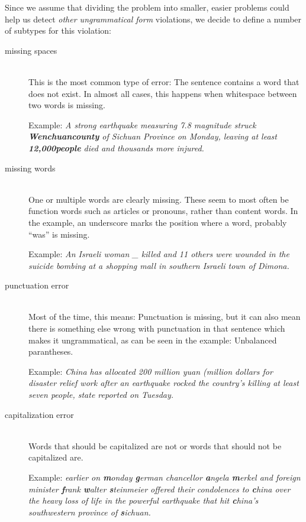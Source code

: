 \documentclass[a4paper,10pt]{scrartcl}
\theoremstyle{style}
\begin{document}
Since we assume that dividing the problem into smaller, easier problems could help us detect \textit{other ungrammatical form} violations, we decide to define a number of subtypes for this violation:

\begin{description}
\item[missing spaces] \hfill \\
	This is the most common type of error: The sentence contains a word that does not exist. In almost all cases, this happens when whitespace between two words is missing.

	Example: \textit{A strong earthquake measuring 7.8 magnitude struck \\\textbf{Wenchuancounty} of Sichuan Province on Monday, leaving at least \\\textbf{12,000people} died and thousands more injured.}

\item[missing words] \hfill \\
	One or multiple words are clearly missing. These seem to most often be function words such as articles or pronouns, rather than content words. In the example, an underscore marks the position where a word, probably ``was'' is missing.

	Example: \textit{An Israeli woman \_ killed and 11 others were wounded in the suicide bombing at a shopping mall in southern Israeli town of Dimona.}

\item[punctuation error] \hfill \\
	Most of the time, this means: Punctuation is missing, but it can also mean there is something else wrong with punctuation in that sentence which makes it ungrammatical, as can be seen in the example: Unbalanced parantheses.

	Example: \textit{China has allocated 200 million yuan (million dollars for disaster relief work after an earthquake rocked the country's killing at least seven people, state reported on Tuesday.}

\item[capitalization error] \hfill \\
	Words that should be capitalized are not or words that should not be capitalized are.

	Example: \textit{earlier on \textbf{m}onday \textbf{g}erman chancellor \textbf{a}ngela \textbf{m}erkel and foreign \\minister \textbf{f}rank \textbf{w}alter \textbf{s}teinmeier offered their condolences to \textbf{c}hina over the heavy loss of life in the powerful earthquake that hit \textbf{c}hina's southwestern province of \textbf{s}ichuan.}


\end{description}
\end{document}
